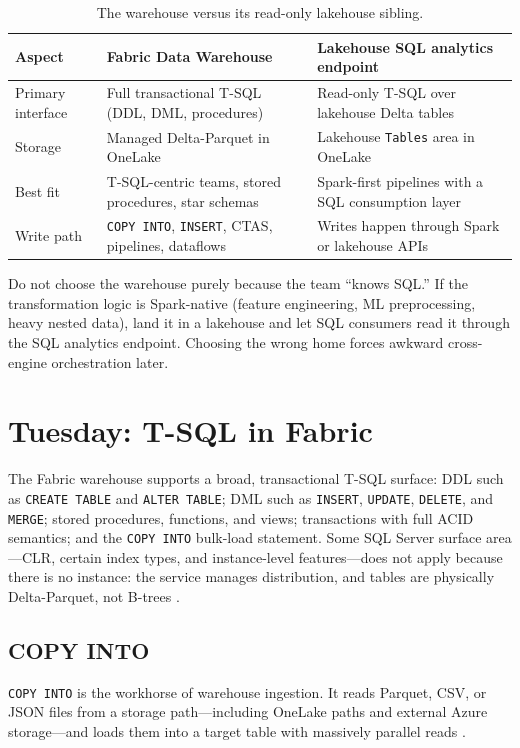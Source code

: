 \begin{table}[H]
\centering
\small
\begin{tabular}{@{}p{3.4cm}p{5.2cm}p{5.4cm}@{}}
\toprule
\textbf{Aspect} & \textbf{Fabric Data Warehouse} & \textbf{Lakehouse SQL analytics endpoint} \\
\midrule
Primary interface & Full transactional T-SQL (DDL, DML, procedures) & Read-only T-SQL over lakehouse Delta tables \\
Storage & Managed Delta-Parquet in OneLake & Lakehouse \texttt{Tables} area in OneLake \\
Best fit & T-SQL-centric teams, stored procedures, star schemas & Spark-first pipelines with a SQL consumption layer \\
Write path & \texttt{COPY INTO}, \texttt{INSERT}, CTAS, pipelines, dataflows & Writes happen through Spark or lakehouse APIs \\
\bottomrule
\end{tabular}
\caption{The warehouse versus its read-only lakehouse sibling.}
\label{tab:chapter5-wh-vs-endpoint}
\end{table}

\begin{pitfall}
Do not choose the warehouse purely because the team ``knows SQL.'' If the transformation logic is Spark-native (feature engineering, ML preprocessing, heavy nested data), land it in a lakehouse and let SQL consumers read it through the SQL analytics endpoint. Choosing the wrong home forces awkward cross-engine orchestration later.
\end{pitfall}

\section{Tuesday: T-SQL in Fabric}
The Fabric warehouse supports a broad, transactional T-SQL surface: DDL such as \texttt{CREATE TABLE} and \texttt{ALTER TABLE}; DML such as \texttt{INSERT}, \texttt{UPDATE}, \texttt{DELETE}, and \texttt{MERGE}; stored procedures, functions, and views; transactions with full ACID semantics; and the \texttt{COPY INTO} bulk-load statement. Some SQL Server surface area---CLR, certain index types, and instance-level features---does not apply because there is no instance: the service manages distribution, and tables are physically Delta-Parquet, not B-trees \cite{microsoftFabricWarehouseTSQL}.

\subsection{COPY INTO}
\texttt{COPY INTO} is the workhorse of warehouse ingestion. It reads Parquet, CSV, or JSON files from a storage path---including OneLake paths and external Azure storage---and loads them into a target table with massively parallel reads \cite{microsoftFabricCopyInto}.


